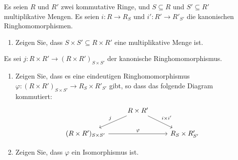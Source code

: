 \begin{question}[subtitle = Lokalisierung und Produkte]
  Es seien $R$ und $R'$ zwei kommutative Ringe, und $S \subseteq R$ und $S' \subseteq R'$ multiplikative Mengen.
  Es seien $i \colon R \to R_S$ und $i' \colon R' \to R'_{S'}$ die kanonischen Ringhomomorphismen.
  \begin{enumerate}
    \item
      Zeigen Sie, dass $S \times S' \subseteq R \times R'$ eine multiplikative Menge ist.
  \end{enumerate}
  Es sei $j \colon R \times R' \to (R \times R')_{S \times S'}$ der kanonische Ringhomomorphismus.
  \begin{enumerate}[resume]
    \item
      Zeigen Sie, dass es eine eindeutigen Ringhomomorphismus $\varphi \colon (R \times R')_{S \times S'} \to R_S \times R'_{S'}$ gibt, so dass das folgende Diagram kommutiert:
      \[
        \begin{tikzcd}[ampersand replacement = \&]
              {}
          \&  R \times R'
              \arrow{dl}[swap]{j}
              \arrow{dr}{i \times i'}
              {}
          \\
              (R \times R')_{S \times S'}
              \arrow{rr}{\varphi}
          \&  {}
          \&  R_S \times R'_{S'}
        \end{tikzcd}
      \]
    \item
      Zeigen Sie, dass $\varphi$ ein Isomorphismus ist.
  \end{enumerate}
\end{question}


